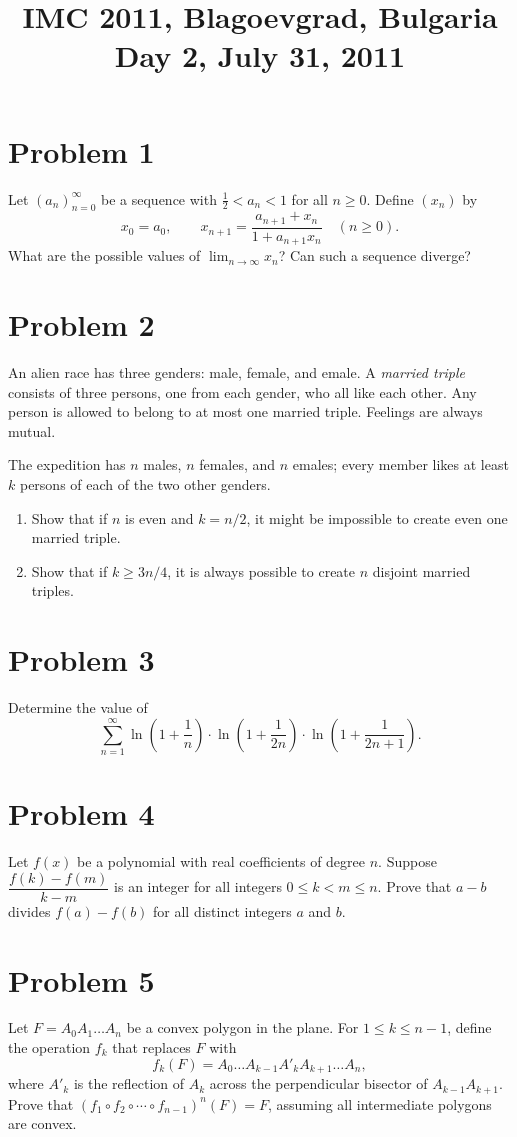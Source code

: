 \documentclass{article}
\title{IMC 2011, Blagoevgrad, Bulgaria \\ Day 2, July 31, 2011}
\date{}
\begin{document}
\maketitle

\section*{Problem 1}
Let $(a_n)_{n=0}^\infty$ be a sequence with $\tfrac{1}{2} < a_n < 1$ for all $n \ge 0$. Define $(x_n)$ by
\[
x_0 = a_0, \qquad x_{n+1} = \frac{a_{n+1} + x_n}{1 + a_{n+1} x_n} \quad (n \ge 0).
\]
What are the possible values of $\lim_{n \to \infty} x_n$? Can such a sequence diverge?

\section*{Problem 2}
An alien race has three genders: male, female, and emale. A \emph{married triple} consists of three persons, one from each gender, who all like each other. Any person is allowed to belong to at most one married triple. Feelings are always mutual.

The expedition has $n$ males, $n$ females, and $n$ emales; every member likes at least $k$ persons of each of the two other genders.
\begin{enumerate}
  \item[a)] Show that if $n$ is even and $k = n/2$, it might be impossible to create even one married triple.
  \item[b)] Show that if $k \ge 3n/4$, it is always possible to create $n$ disjoint married triples.
\end{enumerate}

\section*{Problem 3}
Determine the value of
\[
\sum_{n=1}^\infty \ln\!\left(1 + \frac{1}{n}\right) \cdot \ln\!\left(1 + \frac{1}{2n}\right) \cdot \ln\!\left(1 + \frac{1}{2n+1}\right).
\]

\section*{Problem 4}
Let $f(x)$ be a polynomial with real coefficients of degree $n$. Suppose $\dfrac{f(k) - f(m)}{k - m}$ is an integer for all integers $0 \le k < m \le n$. Prove that $a - b$ divides $f(a) - f(b)$ for all distinct integers $a$ and $b$.

\section*{Problem 5}
Let $F = A_0 A_1 \ldots A_n$ be a convex polygon in the plane. For $1 \le k \le n - 1$, define the operation $f_k$ that replaces $F$ with
\[
f_k(F) = A_0 \ldots A_{k-1} A'_k A_{k+1} \ldots A_n,
\]
where $A'_k$ is the reflection of $A_k$ across the perpendicular bisector of $A_{k-1} A_{k+1}$. Prove that $(f_1 \circ f_2 \circ \cdots \circ f_{n-1})^n (F) = F$, assuming all intermediate polygons are convex.
\end{document}

